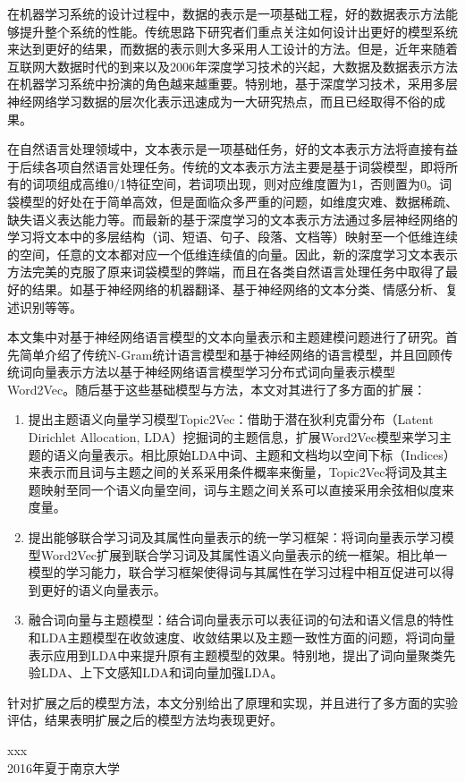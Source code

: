 \documentclass[master]{njuthesis}
\begin{document}
%
\begin{preface}

在机器学习系统的设计过程中，数据的表示是一项基础工程，好的数据表示方法能够提升整个系统的性能。传统思路下研究者们重点关注如何设计出更好的模型系统来达到更好的结果，而数据的表示则大多采用人工设计的方法。但是，近年来随着互联网大数据时代的到来以及2006年深度学习技术的兴起，大数据及数据表示方法在机器学习系统中扮演的角色越来越重要。特别地，基于深度学习技术，采用多层神经网络学习数据的层次化表示迅速成为一大研究热点，而且已经取得不俗的成果。

在自然语言处理领域中，文本表示是一项基础任务，好的文本表示方法将直接有益于后续各项自然语言处理任务。传统的文本表示方法主要是基于词袋模型，即将所有的词项组成高维0/1特征空间，若词项出现，则对应维度置为1，否则置为0。词袋模型的好处在于简单高效，但是面临众多严重的问题，如维度灾难、数据稀疏、缺失语义表达能力等。而最新的基于深度学习的文本表示方法通过多层神经网络的学习将文本中的多层结构（词、短语、句子、段落、文档等）映射至一个低维连续的空间，任意的文本都对应一个低维连续值的向量。因此，新的深度学习文本表示方法完美的克服了原来词袋模型的弊端，而且在各类自然语言处理任务中取得了最好的结果。如基于神经网络的机器翻译、基于神经网络的文本分类、情感分析、复述识别等等\cite{mikolov2013efficient,collobert2008unified,socher2011dynamic}。

本文集中对基于神经网络语言模型的文本向量表示和主题建模问题进行了研究。首先简单介绍了传统N-Gram统计语言模型和基于神经网络的语言模型，并且回顾传统词向量表示方法以基于神经网络语言模型学习分布式词向量表示模型Word2Vec。随后基于这些基础模型与方法，本文对其进行了多方面的扩展：

\begin{enumerate}
\item 提出主题语义向量学习模型Topic2Vec：借助于潜在狄利克雷分布（Latent Dirichlet Allocation, LDA）挖掘词的主题信息，扩展Word2Vec模型来学习主题的语义向量表示。相比原始LDA中词、主题和文档均以空间下标（Indices）来表示而且词与主题之间的关系采用条件概率来衡量，Topic2Vec将词及其主题映射至同一个语义向量空间，词与主题之间关系可以直接采用余弦相似度来度量。
\item 提出能够联合学习词及其属性向量表示的统一学习框架：将词向量表示学习模型Word2Vec扩展到联合学习词及其属性语义向量表示的统一框架。相比单一模型的学习能力，联合学习框架使得词与其属性在学习过程中相互促进可以得到更好的语义向量表示。
\item 融合词向量与主题模型：结合词向量表示可以表征词的句法和语义信息的特性和LDA主题模型在收敛速度、收敛结果以及主题一致性方面的问题，将词向量表示应用到LDA中来提升原有主题模型的效果。特别地，提出了词向量聚类先验LDA、上下文感知LDA和词向量加强LDA。
\end{enumerate}
针对扩展之后的模型方法，本文分别给出了原理和实现，并且进行了多方面的实验评估，结果表明扩展之后的模型方法均表现更好。

\vspace{1cm}
\begin{flushright}
xxx\\
2016年夏于南京大学
\end{flushright}

\end{preface}
\end{document}
